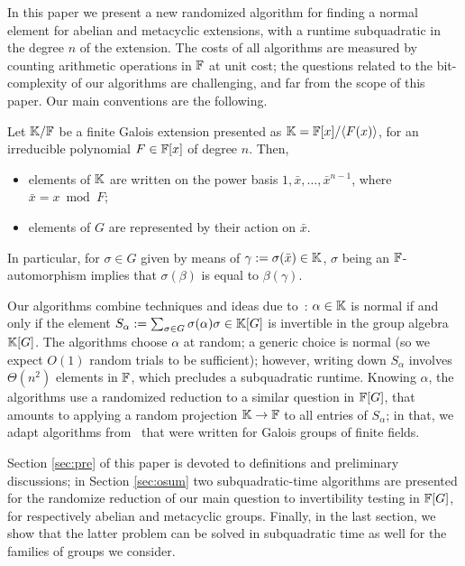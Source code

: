 In this paper we present a new randomized algorithm for finding a
normal element for abelian and metacyclic extensions, with a runtime
subquadratic in the degree $n$ of the extension. The costs of all
algorithms are measured by counting arithmetic operations in $\mathbb{F}$ at
unit cost; the questions related to the bit-complexity of our
algorithms are challenging, and far from the scope of this paper.  Our
main conventions are the following.
\begin{assumption}
  \label{assum}
  Let $\mathbb{K}/\mathbb{F}$ be a finite Galois extension presented as
  $\mathbb{K}=\mathbb{F}[x]/\langle F(x)\rangle$, for an irreducible polynomial $F\in
  \mathbb{F}[x]$ of degree $n$. Then,
  \begin{itemize}
  \item elements of $\mathbb{K}$ are written on the power basis $1,\bar x,\dots,\bar x^{n-1}$,
    where $\bar x = x \bmod F$;
  \item elements of $G$ are represented by their action on $\bar x$.
  \end{itemize}
\end{assumption}
In particular, for $\sigma \in G$ given by means of
$\gamma:=\sigma(\bar x) \in \mathbb{K}$, $\sigma$ being an $\mathbb{F}$-automorphism
implies that $\sigma(\beta)$ is equal to $\beta(\gamma)$.

Our algorithms combine techniques and ideas due
to~\cite{Giesbrecht,Kaltofen}: $\alpha \in \mathbb{K}$ is normal if and only
if the element $S_\alpha := \sum_{\sigma \in G} \sigma(\alpha)\sigma
\in \mathbb{K}[G]$ is invertible in the group algebra $\mathbb{K}[G]$. The algorithms
choose $\alpha$ at random; a generic choice is normal (so we expect
$O(1)$ random trials to be sufficient); however, writing down
$S_\alpha$ involves $\Theta(n^2)$ elements in $\mathbb{F}$, which precludes a
subquadratic runtime. Knowing $\alpha$, the algorithms use a
randomized reduction to a similar question in $\mathbb{F}[G]$, that amounts to
applying a random projection $\mathbb{K}\to\mathbb{F}$ to all entries of $S_\alpha$;
in that, we adapt algorithms from~\cite{Kaltofen} that were written
for Galois groups of finite fields.


Section \ref{sec:pre} of this paper is devoted to definitions and
preliminary discussions; in Section \ref{sec:osum} two
subquadratic-time algorithms are presented for the randomize reduction
of our main question to invertibility testing in $\mathbb{F}[G]$, for
respectively abelian and metacyclic groups.  Finally, in the last
section, we show that the latter problem can be solved in subquadratic
time as well for the families of groups we consider.

